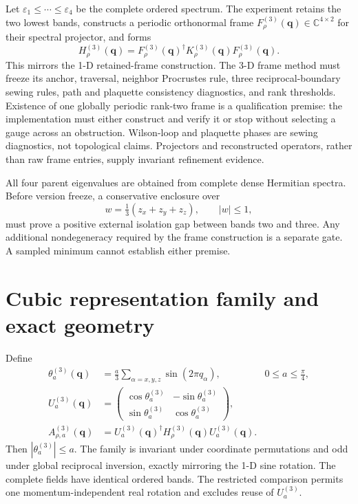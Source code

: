 \documentclass[11pt]{article}
\begin{document}
Let $\varepsilon_1\le\cdots\le\varepsilon_4$ be the complete ordered spectrum. The experiment retains the two lowest bands, constructs a periodic orthonormal frame
$F_\rho^{(3)}(\mathbf q)\in\mathbb C^{4\times2}$ for their spectral projector, and forms
\begin{equation}
 H_\rho^{(3)}(\mathbf q)=
 F_\rho^{(3)}(\mathbf q)^\dagger
 K_\rho^{(3)}(\mathbf q)F_\rho^{(3)}(\mathbf q).
 \label{eq:retained}
\end{equation}
This mirrors the 1-D retained-frame construction. The 3-D frame method must freeze its
anchor, traversal, neighbor Procrustes rule, three reciprocal-boundary sewing rules,
path and plaquette consistency diagnostics, and rank thresholds. Existence of one
globally periodic rank-two frame is a qualification premise: the implementation must
either construct and verify it or stop without selecting a gauge across an obstruction.
Wilson-loop and plaquette phases are sewing diagnostics, not topological claims.
Projectors and reconstructed operators, rather than raw frame entries, supply invariant
refinement evidence.

All four parent eigenvalues are obtained from complete dense Hermitian spectra. Before
version freeze, a conservative enclosure over
\begin{equation}
 w=\tfrac13(z_x+z_y+z_z),\qquad |w|\le1,
\end{equation}
must prove a positive external isolation gap between bands two and three. Any additional
nondegeneracy required by the frame construction is a separate gate. A sampled minimum
cannot establish either premise.

\section{Cubic representation family and exact geometry}

Define
\begin{align}
 \theta_a^{(3)}(\mathbf q)&=
 \frac a3\sum_{\alpha=x,y,z}\sin(2\pi q_\alpha),
 &0\le a\le\frac\pi4,\\
 U_a^{(3)}(\mathbf q)&=
 \begin{pmatrix}
 \cos\theta_a^{(3)}&-\sin\theta_a^{(3)}\\
 \sin\theta_a^{(3)}& \cos\theta_a^{(3)}
 \end{pmatrix},\\
 A_{\rho,a}^{(3)}(\mathbf q)&=
 U_a^{(3)}(\mathbf q)^\dagger H_\rho^{(3)}(\mathbf q)U_a^{(3)}(\mathbf q).
 \label{eq:comparison}
\end{align}
Then $|\theta_a^{(3)}|\le a$. The family is invariant under coordinate permutations and
odd under global reciprocal inversion, exactly mirroring the 1-D sine rotation. The
complete fields have identical ordered bands. The restricted comparison permits one
momentum-independent real rotation and excludes reuse of $U_a^{(3)}$.
\end{document}
